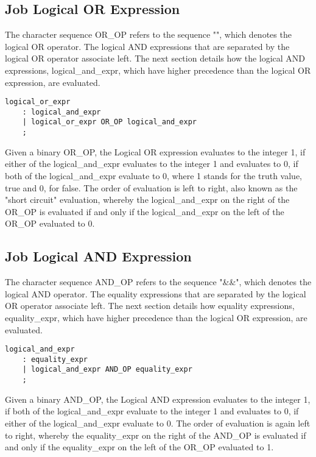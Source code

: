 \documentclass[prodmode,acmtecs]{acmsmall}
\begin{document}

\subsection{Job Logical OR Expression}

The character sequence OR\_OP refers to the sequence "\textbardbl", which  denotes the logical OR operator. The logical AND expressions that are separated by the logical OR operator associate left. The next section details how the logical AND expressions, logical\_and\_expr, which have higher precedence than the logical OR expression, are evaluated. 

\begin{lstlisting}
logical_or_expr
	: logical_and_expr
	| logical_or_expr OR_OP logical_and_expr
	;
\end{lstlisting}

Given a binary OR\_OP, the Logical OR expression evaluates to the integer 1, if either of the logical\_and\_expr evaluates to the integer 1 and evaluates to 0, if both of the logical\_and\_expr evaluate to 0, where 1 stands for the truth value, true and 0, for false. The order of evaluation is left to right, also known as the "short circuit" evaluation, whereby the logical\_and\_expr on the right of the OR\_OP is evaluated if and only if the logical\_and\_expr on the left of the OR\_OP evaluated to 0. 

\subsection{Job Logical AND Expression}

The character sequence AND\_OP refers to the sequence "\&\&", which denotes the logical AND operator. The equality expressions that are separated by the logical OR operator associate left. The next section details how equality expressions, equality\_expr, which have higher precedence than the logical OR expression, are evaluated. 

\begin{lstlisting}
logical_and_expr
	: equality_expr
	| logical_and_expr AND_OP equality_expr
	;
\end{lstlisting}

Given a binary AND\_OP, the Logical AND expression evaluates to the integer 1, if both of the logical\_and\_expr evaluate to the integer 1 and evaluates to 0, if either of the logical\_and\_expr evaluate to 0. The order of evaluation is again left to right, whereby the equality\_expr on the right of the AND\_OP is evaluated if and only if the equality\_expr on the left of the OR\_OP evaluated to 1.
\end{document}
